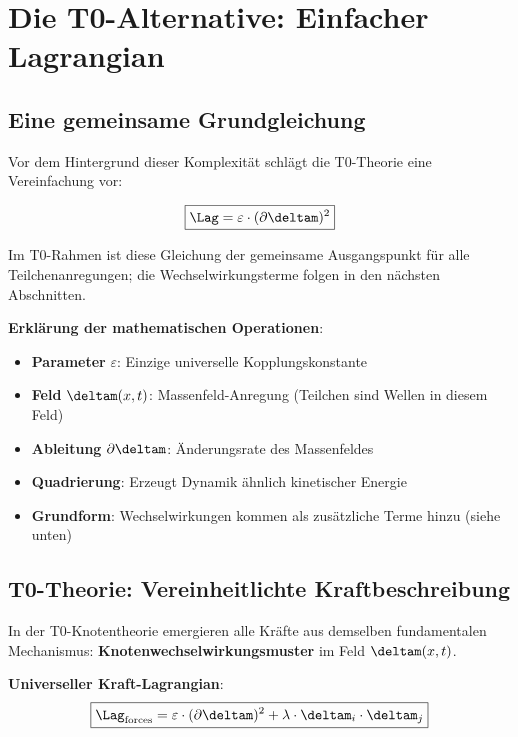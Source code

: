 	\section{Die T0-Alternative: Einfacher Lagrangian}
	
	\subsection{Eine gemeinsame Grundgleichung}
	
	Vor dem Hintergrund dieser Komplexität schlägt die T0-Theorie eine Vereinfachung vor:
	
	\begin{equation}
		\boxed{\Lag = \varepsilon \cdot (\partial \deltam)^2}
		\label{eq:revolutionary_lagrangian}
	\end{equation}
	
	Im T0-Rahmen ist diese Gleichung der gemeinsame Ausgangspunkt für alle Teilchenanregungen; die Wechselwirkungsterme folgen in den nächsten Abschnitten.
	
	\textbf{Erklärung der mathematischen Operationen}:
	\begin{itemize}
		\item \textbf{Parameter} $\varepsilon$: Einzige universelle Kopplungskonstante
		\item \textbf{Feld} $\deltam(x,t)$: Massenfeld-Anregung (Teilchen sind Wellen in diesem Feld)
		\item \textbf{Ableitung} $\partial \deltam$: Änderungsrate des Massenfeldes
		\item \textbf{Quadrierung}: Erzeugt Dynamik ähnlich kinetischer Energie
		\item \textbf{Grundform}: Wechselwirkungen kommen als zusätzliche Terme hinzu (siehe unten)
	\end{itemize}
	
	\subsection{T0-Theorie: Vereinheitlichte Kraftbeschreibung}
	
	In der T0-Knotentheorie emergieren alle Kräfte aus demselben fundamentalen Mechanismus: \textbf{Knotenwechselwirkungsmuster} im Feld $\deltam(x,t)$.
	
	\textbf{Universeller Kraft-Lagrangian}:
	\begin{equation}
		\boxed{\Lag_{\text{forces}} = \varepsilon \cdot (\partial \deltam)^2 + \lambda \cdot \deltam_i \cdot \deltam_j}
	\end{equation}
	

